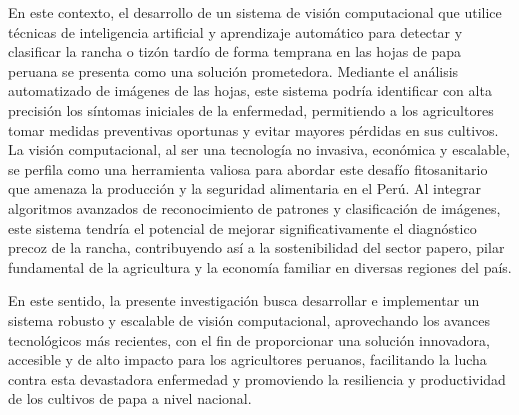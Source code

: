 En este contexto, el desarrollo de un sistema de visión computacional que utilice técnicas de inteligencia artificial y aprendizaje automático para detectar y clasificar la rancha o tizón tardío de forma temprana en las hojas de papa peruana se presenta como una solución prometedora. Mediante el análisis automatizado de imágenes de las hojas, este sistema podría identificar con alta precisión los síntomas iniciales de la enfermedad, permitiendo a los agricultores tomar medidas preventivas oportunas y evitar mayores pérdidas en sus cultivos. La visión computacional, al ser una tecnología no invasiva, económica y escalable, se perfila como una herramienta valiosa para abordar este desafío fitosanitario que amenaza la producción y la seguridad alimentaria en el Perú. Al integrar algoritmos avanzados de reconocimiento de patrones y clasificación de imágenes, este sistema tendría el potencial de mejorar significativamente el diagnóstico precoz de la rancha, contribuyendo así a la sostenibilidad del sector papero, pilar fundamental de la agricultura y la economía familiar en diversas regiones del país.

En este sentido, la presente investigación busca desarrollar e implementar un sistema robusto y escalable de visión computacional, aprovechando los avances tecnológicos más recientes, con el fin de proporcionar una solución innovadora, accesible y de alto impacto para los agricultores peruanos, facilitando la lucha contra esta devastadora enfermedad y promoviendo la resiliencia y productividad de los cultivos de papa a nivel nacional.





